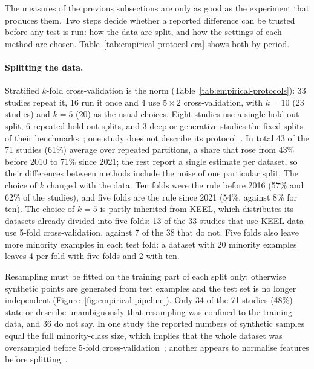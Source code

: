 The measures of the previous subsections are only as good as the experiment that produces them. Two steps decide whether a reported difference can be trusted before any test is run: how the data are split, and how the settings of each method are chosen. Table~\ref{tab:empirical-protocol-era} shows both by period.

\paragraph{Splitting the data.} Stratified $k$-fold cross-validation is the norm (Table~\ref{tab:empirical-protocols}): 33 studies repeat it, 16 run it once and 4 use $5\times2$ cross-validation, with $k = 10$ (23 studies) and $k = 5$ (20) as the usual choices. Eight studies use a single hold-out split, 6 repeated hold-out splits, and 3 deep or generative studies the fixed splits of their benchmarks~\parencite{buda2018systematic,xu2019ctgan,mullick2019gamo}; one study does not describe its protocol~\parencite{datta2020dlexiboost}. In total 43 of the 71 studies (61\%) average over repeated partitions, a share that rose from 43\% before 2010 to 71\% since 2021; the rest report a single estimate per dataset, so their differences between methods include the noise of one particular split. The choice of $k$ changed with the data. Ten folds were the rule before 2016 (57\% and 62\% of the studies), and five folds are the rule since 2021 (54\%, against 8\% for ten). The choice of $k = 5$ is partly inherited from KEEL, which distributes its datasets already divided into five folds: 13 of the 33 studies that use KEEL data use 5-fold cross-validation, against 7 of the 38 that do not. Five folds also leave more minority examples in each test fold: a dataset with 20 minority examples leaves 4 per fold with five folds and 2 with ten.





Resampling must be fitted on the training part of each split only; otherwise synthetic points are generated from test examples and the test set is no longer independent (Figure~\ref{fig:empirical-pipeline}). Only 34 of the 71 studies (48\%) state or describe unambiguously that resampling was confined to the training data, and 36 do not say. In one study the reported numbers of synthetic samples equal the full minority-class size, which implies that the whole dataset was oversampled before 5-fold cross-validation~\parencite{almajzoub2020absmote}; another appears to normalise features before splitting~\parencite{tao2025mcnclwo}.

